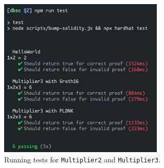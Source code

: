 \documentclass{article}
\begin{document}
\begin{figure}[h]
    \centering
    \includegraphics[width=0.7\textwidth]{tests.png}
    \caption*{Running tests for \texttt{Multiplier2} and \texttt{Multiplier3}.}
\end{figure}
\end{document}
